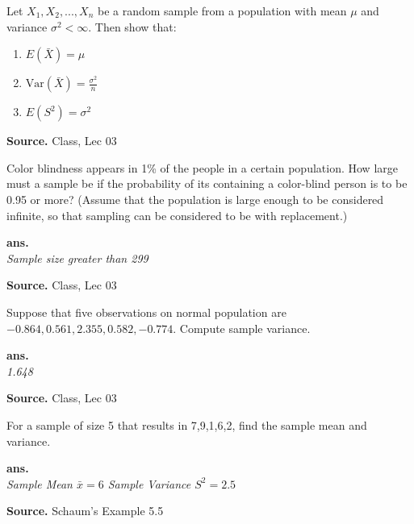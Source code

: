 \documentclass[12pt,twoside]{report}
\newenvironment*{ans}{\textbf{ans.}\space\em\\}{\par}
\newenvironment*{source}{\hfill\scriptsize\textbf{Source.}\space}{\par}
\begin{document}
\begin{samepage}
\begin{ex}
    Let $X_1, X_2, ..., X_n$ be a random sample from a population with mean $\mu $ and variance $\sigma ^2 < \infty$. Then show that:
    \begin{enumerate}
        \item $E\left (\bar{X}\right ) = \mu $
        \item $\text{Var}\left (\bar{X}\right ) = \frac{\sigma ^2}{n}$
        \item $E\left (S ^2\right ) = \sigma ^2$
    \end{enumerate}
\end{ex}
\begin{source}
Class, Lec 03
\end{source}
\end{samepage}

\begin{samepage}
\begin{ex}
Color blindness appears in 1\%  of the people in a certain population. How large must a sample be if the probability of its containing a color-blind person is to be 0.95 or more? (Assume that the population is large enough to be considered infinite, so that sampling can be considered to be with replacement.)
\end{ex}
\begin{ans}
Sample size greater than 299
\end{ans}
\begin{source}
Class, Lec 03
\end{source}
\end{samepage}

\begin{samepage}
\begin{ex}
Suppose that five observations on normal population are \\
$-0.864, 0.561, 2.355, 0.582, -0.774$.
Compute sample variance.
\end{ex}
\begin{ans}
1.648
\end{ans}
\begin{source}
Class, Lec 03
\end{source}
\end{samepage}

\begin{samepage}
\begin{ex}
    For a sample of size 5 that results in 7,9,1,6,2, find the sample mean and variance.
\end{ex}
\begin{ans}
Sample Mean $\bar{x} = 6$
Sample Variance $S^2 = 2.5$
\end{ans}
\begin{source}
Schaum's Example 5.5
\end{source}
\end{samepage}
\end{document}

